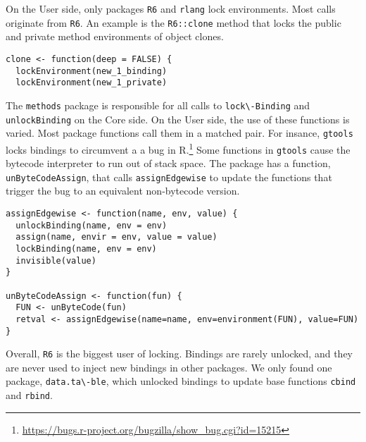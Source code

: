 \documentclass[sigplan,screen]{acmart}
\renewcommand{\c}[1]{\lstinline |#1|\xspace}
\begin{document}
On the {User} side, only packages \c{R6} and \c{rlang} lock environments. Most
calls originate from \c{R6}. An example is the \c{R6::clone} method that locks
the public and private method environments of object clones.

\begin{lstlisting}
clone <- function(deep = FALSE) {
  lockEnvironment(new_1_binding)
  lockEnvironment(new_1_private)
\end{lstlisting}\medskip

The \c{methods} package is responsible for all calls to \c{lock\-Binding} and
\c{unlockBinding} on the {Core} side. On the {User} side, the use of these
functions is varied. Most package functions call them in a matched pair. For
insance, \c{gtools} locks bindings to circumvent a a bug in
R.\footnote{\url{https://bugs.r-project.org/bugzilla/show_bug.cgi?id=15215}}
Some functions in \c{gtools} cause the bytecode interpreter to run out of stack
space. The package has a function, \c{unByteCodeAssign}, that calls
\c{assignEdgewise} to update the functions that trigger the bug to an equivalent
non-bytecode version.

\begin{lstlisting}
assignEdgewise <- function(name, env, value) {
  unlockBinding(name, env = env)
  assign(name, envir = env, value = value)
  lockBinding(name, env = env)
  invisible(value)
}

unByteCodeAssign <- function(fun) {
  FUN <- unByteCode(fun)
  retval <- assignEdgewise(name=name, env=environment(FUN), value=FUN)
}
\end{lstlisting}\medskip

Overall, \c{R6} is the biggest user of locking. Bindings are rarely unlocked,
and they are never used to inject new bindings in other packages. We only found
one package, \c{data.ta\-ble}, which unlocked bindings to update base functions
\c{cbind} and \c{rbind}.
\end{document}
